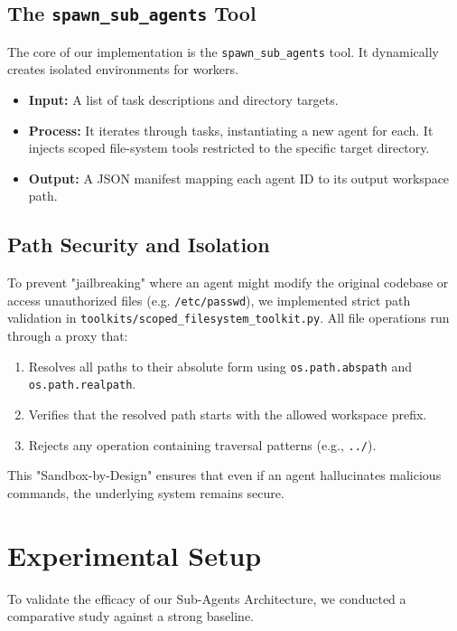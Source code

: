 \documentclass[conference]{IEEEtran}
\begin{document}
\subsection{The \texttt{spawn\_sub\_agents} Tool}
The core of our implementation is the \texttt{spawn\_sub\_agents} tool. It dynamically creates isolated environments for workers.
\begin{itemize}
    \item \textbf{Input:} A list of task descriptions and directory targets.
    \item \textbf{Process:} It iterates through tasks, instantiating a new agent for each. It injects scoped file-system tools restricted to the specific target directory.
    \item \textbf{Output:} A JSON manifest mapping each agent ID to its output workspace path.
\end{itemize}

\subsection{Path Security and Isolation}
To prevent "jailbreaking" where an agent might modify the original codebase or access unauthorized files (e.g. \texttt{/etc/passwd}), we implemented strict path validation in \texttt{toolkits/scoped\_filesystem\_toolkit.py}. All file operations run through a proxy that:
\begin{enumerate}
    \item Resolves all paths to their absolute form using \texttt{os.path.abspath} and \texttt{os.path.realpath}.
    \item Verifies that the resolved path starts with the allowed workspace prefix.
    \item Rejects any operation containing traversal patterns (e.g., \texttt{../}).
\end{enumerate}
This "Sandbox-by-Design" ensures that even if an agent hallucinates malicious commands, the underlying system remains secure.

\section{Experimental Setup}
To validate the efficacy of our Sub-Agents Architecture, we conducted a comparative study against a strong baseline.
\end{document}
